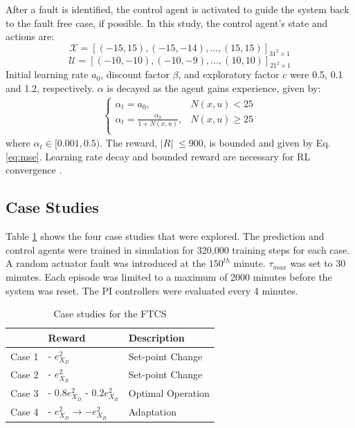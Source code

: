 After a fault is identified, the control agent is activated to guide the system back to the fault free case, if possible. In this study, the control agent's state and actions are:
\begin{equation}
{\mathcal{X}} = [(-15, 15), (-15, -14), ..., (15, 15)]_{31^2 \times 1}
\label{eq:states_case_study}
\end{equation}
\begin{equation}
{\mathcal{U}} = [(-10, -10), (-10, -9), ..., (10, 10)]_{21^2 \times 1}
\label{eq:actions_case_study}
\end{equation}
Initial learning rate $a_0$, discount factor $\beta$, and exploratory factor $c$ were 0.5, 0.1 and 1.2, respectively. $\alpha$ is decayed as the agent gains experience, given by:
\begin{eqnarray}
\left\{
\begin{matrix}
    \alpha_t = a_0, & N(x, u) < 25 \\
    \alpha _t = \frac{\alpha_0}{1 + N(x, u)}, & N(x, u) \geq 25 \\
\end{matrix} \right.
\label{eq:learning_rate}
\end{eqnarray}
where $\alpha_t \in [0.001, 0.5)$. The reward, $|R| \; \leq 900$, is bounded and given by Eq. \ref{eq:mse}.  Learning rate decay and bounded reward are necessary for RL convergence \cite{convergence_rl_ref20}.
\subsection{Case Studies}
Table \ref{tab:case_studies} shows the four case studies that were explored.  The prediction and control agents were trained in simulation for 320,000 training steps for each case. A random actuator fault was introduced at the $150^{th}$ minute. $\tau_{max}$ was set to 30 minutes. Each episode was limited to a maximum of 2000 minutes before the system was reset. The PI controllers were evaluated every 4 minutes.
\begin{table}[htb]
	\begin{center}
		\caption{\label{tab:case_studies} Case studies for the FTCS}
	\def\arraystretch{1.3}
	\begin{tabular}{p{1.8cm}p{4cm}p{5cm}}
	\hline
	 & Reward & Description \\
	 \hline
	 Case 1 & - $e_{X_D}^2$ & Set-point Change \\
	 Case 2 & - $e_{X_B}^2$ & Set-point Change \\
	 Case 3 & - $0.8e_{X_D}^2$ - $0.2e_{X_B}^2$ & Optimal Operation \\
	 Case 4 & - $e_{X_D}^2  \rightarrow - e_{X_B}^2$ & Adaptation \\
	\hline
	\end{tabular}
	\end{center}
\end{table}


